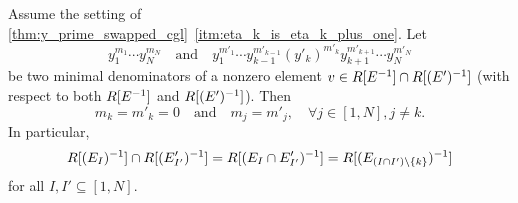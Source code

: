 \begin{theorem}\label{thm:minimal_denominators}
	Assume the setting of \cref{thm:y_prime_swapped_cgl}~\ref*{itm:eta_k_is_eta_k_plus_one}. Let
	\begin{equation*}
		y_1^{m_1}\cdots y_N^{m_N} \quad \text{and} \quad y_1^{m'_1} \cdots y_{k-1}^{m'_{k-1}}(y'_k)^{m'_k}y_{k+1}^{m'_{k+1}} \cdots y_N^{m'_N}
	\end{equation*}
	be two minimal denominators of a nonzero element $v \in R[E^{-1}] \cap R[(E')^{-1}]$
	(with respect to both $R[E^{-1}]$ and $R[(E')^{-1}]$). Then
	\begin{equation*}
		m_k = m'_k = 0 \quad \text{and} \quad m_j = m'_j,\quad \forall j \in [1, N], j \neq k.
	\end{equation*}
	In particular,
	\begin{equation*}
		R[(E_I)^{-1}] \cap R[(E'_{I'})^{-1}] = R[(E_I \cap E'_{I'})^{-1}] = R[(E_{(I \cap I')\setminus \{k\}})^{-1}]
	\end{equation*}
	for all $I,I' \subseteq [1, N]$.
\end{theorem}

